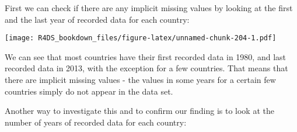 \documentclass[]{article}
\newenvironment{Shaded}{\begin{snugshade}}{\end{snugshade}}
\newcommand{\KeywordTok}[1]{\textcolor[rgb]{0.13,0.29,0.53}{\textbf{#1}}}
\newcommand{\DataTypeTok}[1]{\textcolor[rgb]{0.13,0.29,0.53}{#1}}
\newcommand{\StringTok}[1]{\textcolor[rgb]{0.31,0.60,0.02}{#1}}
\newcommand{\OperatorTok}[1]{\textcolor[rgb]{0.81,0.36,0.00}{\textbf{#1}}}
\newcommand{\NormalTok}[1]{#1}
\theoremstyle{definition}
\theoremstyle{definition}
\theoremstyle{definition}
\theoremstyle{remark}
\begin{document}
First we can check if there are any implicit missing values by looking
at the first and the last year of recorded data for each country:

\begin{Shaded}
\end{Shaded}

\texttt{[image: R4DS\_bookdown\_files/figure-latex/unnamed-chunk-204-1.pdf]}

We can see that most countries have their first recorded data in 1980,
and last recorded data in 2013, with the exception for a few countries.
That means that there are implicit missing values - the values in some
years for a certain few countries simply do not appear in the data set.

Another way to investigate this and to confirm our finding is to look at
the number of years of recorded data for each country:

\begin{Shaded}
\end{Shaded}
\end{document}
